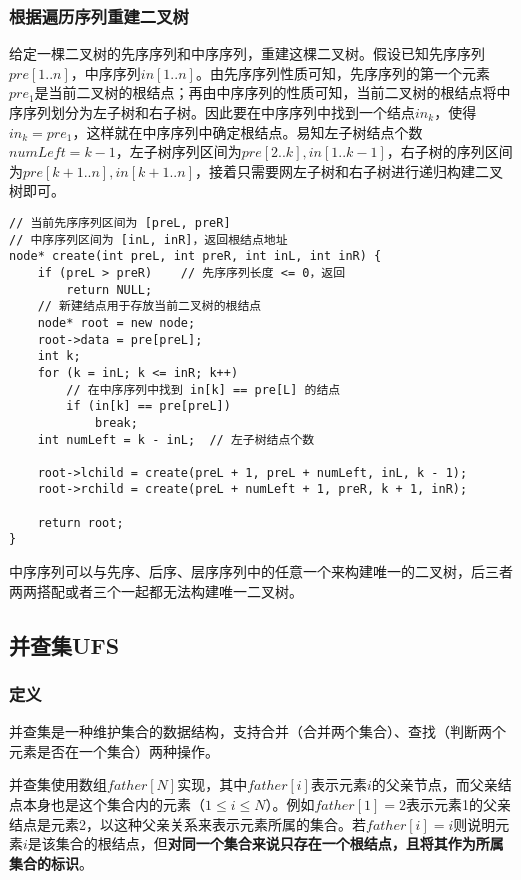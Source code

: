 \subsubsection{根据遍历序列重建二叉树}

给定一棵二叉树的先序序列和中序序列，重建这棵二叉树。假设已知先序序列$pre[1..n]$，中序序列$in[1..n]$。由先序序列性质可知，先序序列的第一个元素$pre_1$是当前二叉树的根结点；再由中序序列的性质可知，当前二叉树的根结点将中序序列划分为左子树和右子树。因此要在中序序列中找到一个结点$in_k$，使得$in_k=pre_1$，这样就在中序序列中确定根结点。易知左子树结点个数$numLeft=k-1$，左子树序列区间为$pre[2..k],in[1..k-1]$，右子树的序列区间为$pre[k+1..n],in[k+1..n]$，接着只需要网左子树和右子树进行递归构建二叉树即可。

\begin{lstlisting}
// 当前先序序列区间为 [preL, preR]
// 中序序列区间为 [inL, inR]，返回根结点地址
node* create(int preL, int preR, int inL, int inR) {
	if (preL > preR)	// 先序序列长度 <= 0，返回
		return NULL;
	// 新建结点用于存放当前二叉树的根结点
	node* root = new node;
	root->data = pre[preL];
	int k;
	for (k = inL; k <= inR; k++)
		// 在中序序列中找到 in[k] == pre[L] 的结点
		if (in[k] == pre[preL])
			break;
	int numLeft = k - inL;	// 左子树结点个数
	
	root->lchild = create(preL + 1, preL + numLeft, inL, k - 1);
	root->rchild = create(preL + numLeft + 1, preR, k + 1, inR);
	
	return root;
}
\end{lstlisting}

中序序列可以与先序、后序、层序序列中的任意一个来构建唯一的二叉树，后三者两两搭配或者三个一起都无法构建唯一二叉树。


\subsection{并查集UFS}

\subsubsection{定义}

并查集是一种维护集合的数据结构，支持合并（合并两个集合）、查找（判断两个元素是否在一个集合）两种操作。

并查集使用数组$father[N]$实现，其中$father[i]$表示元素$i$的父亲节点，而父亲结点本身也是这个集合内的元素（$1\leq i\leq N$）。例如$father[1]=2$表示元素1的父亲结点是元素2，以这种父亲关系来表示元素所属的集合。若$father[i]=i$则说明元素$i$是该集合的根结点，但\textbf{对同一个集合来说只存在一个根结点，且将其作为所属集合的标识}。


